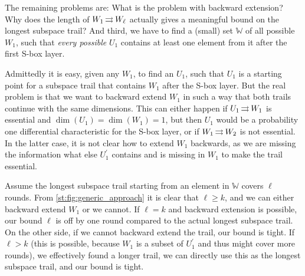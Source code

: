 The remaining problems are:
What is the problem with backward extension?
Why does the length of $W_1 \operatorname*{\rightrightarrows}^{}_{} W_\ell$ actually gives a meaningful bound on the longest subspace trail?
And third, we have to find a (small) set $\mathbb{W}$ of all possible $W_1$, such that \emph{every possible} $U_1$ contains at least one element from it after the first S-box layer.

Admittedly it is easy, given any $W_1$, to find an $U_1$, such that $U_1$ is a starting point for a subspace trail that contains $W_1$ after the S-box layer.
But the real problem is that we want to backward extend $W_1$ in such a way that both trails continue with the same dimensions.
This can either happen if $U_1 \operatorname*{\rightrightarrows}^{}_{} W_1$ is essential and $\dim(U_1) = \dim(W_1) = 1$, but then $U_1$ would be a probability one differential characteristic for the S-box layer, or if $W_1 \operatorname*{\rightrightarrows}^{}_{} W_2$ is not essential.
In the latter case, it is not clear how to extend $W_1$ backwards, as we are missing the information what else $U_1^\prime$ contains and is missing in $W_1$ to make the trail essential.

Assume the longest subspace trail starting from an element in $\mathbb{W}$ covers $\ell$ rounds.
From \cref{st:fig:generic_approach} it is clear that $\ell \geqslant k$, and we can either backward extend $W_1$ or we cannot.
If $\ell = k$ and backward extension is possible, our bound $\ell$ is off by one round compared to the actual longest subspace trail.
On the other side, if we cannot backward extend the trail, our bound is tight.
If $\ell > k$ (this is possible, because $W_1$ is a subset of $U_1^\prime$ and thus might cover more rounds), we effectively found a longer trail, we can directly use this as the longest subspace trail, and our bound is tight.

